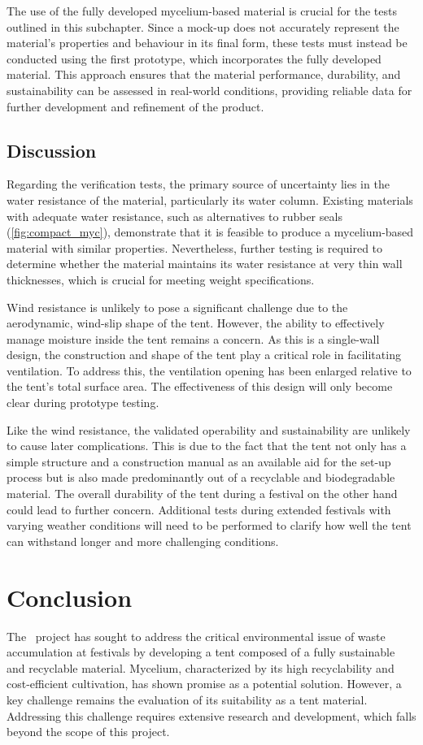 \documentclass{article}
\begin{document}
The use of the fully developed mycelium-based material is crucial for the tests outlined
in this subchapter. Since a mock-up does not accurately represent the material's
properties and behaviour in its final form, these tests must instead be conducted using
the first prototype, which incorporates the fully developed material. This approach
ensures that the material performance, durability, and sustainability can be assessed in
real-world conditions, providing reliable data for further development and refinement of
the product.

\subsection{Discussion}
\label{sec:discussion}
Regarding the verification tests, the primary source of uncertainty lies in the water resistance
of the material, particularly its water column. Existing materials with adequate water
resistance, such as alternatives to rubber seals (\autoref{fig:compact_myc}), demonstrate
that it is feasible to produce a mycelium-based material with similar properties. Nevertheless,
further testing is required to determine whether the material maintains its water
resistance at very thin wall thicknesses, which is crucial for meeting weight specifications.

Wind resistance is unlikely to pose a significant challenge due to the aerodynamic, wind-slip
shape of the tent. However, the ability to effectively manage moisture inside the tent remains
a concern. As this is a single-wall design, the construction and shape of the tent play a critical
role in facilitating ventilation. To address this, the ventilation opening has been enlarged
relative to the tent's total surface area. The effectiveness of this design will only become clear
during prototype testing.

Like the wind resistance, the validated operability and sustainability are unlikely to cause later
complications. This is due to the fact that the tent not only has a simple structure and a
construction manual as an available aid for the set-up process but is also made predominantly
out of a recyclable and biodegradable material. The overall durability of the tent during a
festival on the other hand could lead to further concern. Additional tests during extended
festivals with varying weather conditions will need to be performed to clarify how well the
tent can withstand longer and more challenging conditions.

\section{Conclusion}
The \myc\ project has sought to address the critical environmental issue of waste
accumulation at festivals by developing a tent composed of a fully sustainable and recyclable
material. Mycelium, characterized by its high recyclability and cost-efficient cultivation, has
shown promise as a potential solution. However, a key challenge remains the evaluation of its
suitability as a tent material. Addressing this challenge requires extensive research and
development, which falls beyond the scope of this project.
\end{document}
